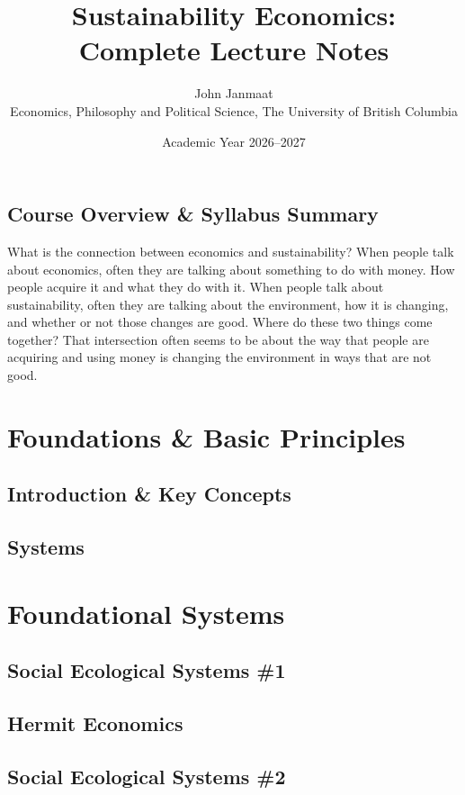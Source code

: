 \documentclass[11pt, letterpaper, twoside]{book} %
\title{\textbf{Sustainability Economics: Complete Lecture Notes}}
\author{John Janmaat \\ \small Economics, Philosophy and Political Science, The University of British Columbia}
\date{Academic Year 2026--2027}
\begin{document}
	
	\frontmatter
	\maketitle
	\tableofcontents
	
	\chapter*{Course Overview \& Syllabus Summary}
	What is the connection between economics and sustainability?  When people talk about economics, often they are talking about something to do with money.  How people acquire it and what they do with it.  When people talk about sustainability, often they are talking about the environment, how it is changing, and whether or not those changes are good.  Where do these two things come together?  That intersection often seems to be about the way that people are acquiring and using money is changing the environment in ways that are not good.
	
	\mainmatter
	
	\part{Foundations \& Basic Principles}
	
	\chapter{Introduction \& Key Concepts}
	
	
	\chapter{Systems}
	
	
	\part{Foundational Systems}
	
	\chapter{Social Ecological Systems \#1}
	
	
	\chapter{Hermit Economics}
	
	
	\chapter{Social Ecological Systems \#2}
	
	
	\backmatter
	
\end{document}
